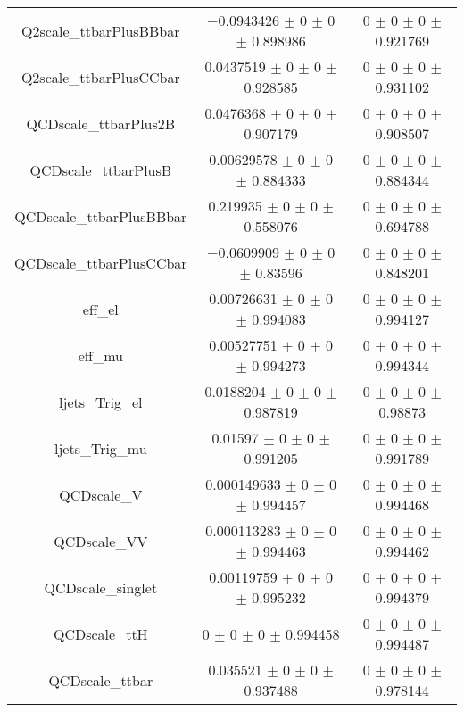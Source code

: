 \begin{table}
\begin{tabular}{ccc}
Q2scale\_ttbarPlusBBbar & \num{-0.0943426} $\pm$ \num{0} $\pm$ \num{0} $\pm$ \num{0.898986} & \num{0} $\pm$ \num{0} $\pm$ \num{0} $\pm$ \num{0.921769}\\
Q2scale\_ttbarPlusCCbar & \num{0.0437519} $\pm$ \num{0} $\pm$ \num{0} $\pm$ \num{0.928585} & \num{0} $\pm$ \num{0} $\pm$ \num{0} $\pm$ \num{0.931102}\\
QCDscale\_ttbarPlus2B & \num{0.0476368} $\pm$ \num{0} $\pm$ \num{0} $\pm$ \num{0.907179} & \num{0} $\pm$ \num{0} $\pm$ \num{0} $\pm$ \num{0.908507}\\
QCDscale\_ttbarPlusB & \num{0.00629578} $\pm$ \num{0} $\pm$ \num{0} $\pm$ \num{0.884333} & \num{0} $\pm$ \num{0} $\pm$ \num{0} $\pm$ \num{0.884344}\\
QCDscale\_ttbarPlusBBbar & \num{0.219935} $\pm$ \num{0} $\pm$ \num{0} $\pm$ \num{0.558076} & \num{0} $\pm$ \num{0} $\pm$ \num{0} $\pm$ \num{0.694788}\\
QCDscale\_ttbarPlusCCbar & \num{-0.0609909} $\pm$ \num{0} $\pm$ \num{0} $\pm$ \num{0.83596} & \num{0} $\pm$ \num{0} $\pm$ \num{0} $\pm$ \num{0.848201}\\
eff\_el & \num{0.00726631} $\pm$ \num{0} $\pm$ \num{0} $\pm$ \num{0.994083} & \num{0} $\pm$ \num{0} $\pm$ \num{0} $\pm$ \num{0.994127}\\
eff\_mu & \num{0.00527751} $\pm$ \num{0} $\pm$ \num{0} $\pm$ \num{0.994273} & \num{0} $\pm$ \num{0} $\pm$ \num{0} $\pm$ \num{0.994344}\\
ljets\_Trig\_el & \num{0.0188204} $\pm$ \num{0} $\pm$ \num{0} $\pm$ \num{0.987819} & \num{0} $\pm$ \num{0} $\pm$ \num{0} $\pm$ \num{0.98873}\\
ljets\_Trig\_mu & \num{0.01597} $\pm$ \num{0} $\pm$ \num{0} $\pm$ \num{0.991205} & \num{0} $\pm$ \num{0} $\pm$ \num{0} $\pm$ \num{0.991789}\\
QCDscale\_V & \num{0.000149633} $\pm$ \num{0} $\pm$ \num{0} $\pm$ \num{0.994457} & \num{0} $\pm$ \num{0} $\pm$ \num{0} $\pm$ \num{0.994468}\\
QCDscale\_VV & \num{0.000113283} $\pm$ \num{0} $\pm$ \num{0} $\pm$ \num{0.994463} & \num{0} $\pm$ \num{0} $\pm$ \num{0} $\pm$ \num{0.994462}\\
QCDscale\_singlet & \num{0.00119759} $\pm$ \num{0} $\pm$ \num{0} $\pm$ \num{0.995232} & \num{0} $\pm$ \num{0} $\pm$ \num{0} $\pm$ \num{0.994379}\\
QCDscale\_ttH & \num{0} $\pm$ \num{0} $\pm$ \num{0} $\pm$ \num{0.994458} & \num{0} $\pm$ \num{0} $\pm$ \num{0} $\pm$ \num{0.994487}\\
QCDscale\_ttbar & \num{0.035521} $\pm$ \num{0} $\pm$ \num{0} $\pm$ \num{0.937488} & \num{0} $\pm$ \num{0} $\pm$ \num{0} $\pm$ \num{0.978144}\\

\end{tabular}
\end{table}

